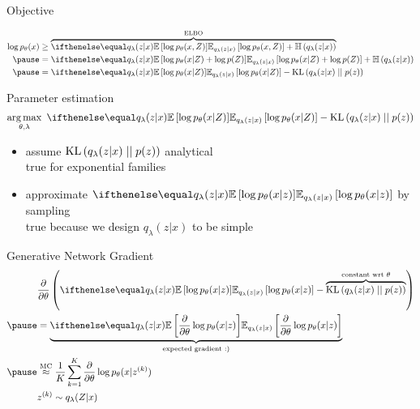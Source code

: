 \begin{frame}[plain]{Objective}

\begin{equation*}
\begin{aligned}
\log p_\theta(x) &\geq \overbrace{\E[q_\lambda(z|x)]{\log p_\theta(x,Z)} + \Ent{q_\lambda(z|x)}}^{\ELBO} \\ 
\pause
&= \E[q_\lambda(z|x)]{\log p_\theta(x|Z) + \log p(Z)} + \Ent{q_\lambda(z|x)} \\ \pause
&= \E[q_\lambda(z|x)]{\log p_\theta(x|Z)} - \KL{q_\lambda(z|x)}{p(z)}
\end{aligned}
\end{equation*}

\pause

Parameter estimation
\begin{equation*}
\argmax_{\theta,\lambda} ~ \E[q_\lambda(z|x)]{\log p_\theta(x|Z)} - \KL{q_\lambda(z|x)}{p(z)}
\end{equation*}

\pause

\begin{itemize}
	\item assume $\operatorname{KL}\left(q_\lambda(z|x)\mid\mid p(z)\right)$  analytical\\
	true for exponential families \pause
	\item approximate $\E[q_\lambda(z|x)]{\log p_\theta(x|z)}$ by sampling\\
	true because we design $q_\lambda(z|x)$ to be simple
\end{itemize}


\end{frame}

\begin{frame}[plain]{Generative Network Gradient}
\begin{equation*}
\begin{aligned}
&\pdv{\theta} \left( \E[q_\lambda(z|x)]{\log p_\theta(x|z)} - \overbrace{\KL{q_\lambda(z|x)}{p(z)}}^{\text{constant wrt }\theta} \right) \\ \pause 
&=\underbrace{\E[q_\lambda(z|x)]{\pdv{\theta}\log p_\theta(x|z)}}_{\text{expected gradient :)}} \\ \pause
&\overset{\text{MC}}{\approx} \frac{1}{K}\sum_{k=1}^{K}
\pdv{\theta} \log p_\theta(x|z^{(k)}) \\
&z^{(k)} \sim q_\lambda(Z|x)
\end{aligned}
\end{equation*}
\pause
{}
\end{frame}

